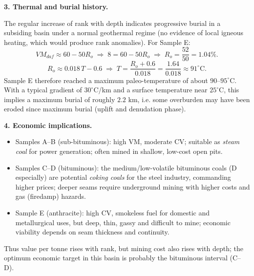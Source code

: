 \documentclass[11pt]{article}
\begin{document}
\begin{corrige}
\textbf{3. Thermal and burial history.}\par
The regular increase of rank with depth indicates progressive burial in a subsiding basin under a normal geothermal regime (no evidence of local igneous heating, which would produce rank anomalies). For Sample E:
\[
VM_{daf} \approx 60 - 50R_o \;\Rightarrow\; 8 = 60 - 50R_o \;\Rightarrow\; R_o = \frac{52}{50} = 1.04\%.
\]
\[
R_o \approx 0.018\,T - 0.6 \;\Rightarrow\; T = \frac{R_o + 0.6}{0.018} = \frac{1.64}{0.018} \approx 91^\circ\mathrm{C}.
\]
Sample E therefore reached a maximum paleo-temperature of about $90$--$95^\circ$C. With a typical gradient of $30^\circ$C/km and a surface temperature near $25^\circ$C, this implies a maximum burial of roughly $2.2$ km, i.e. some overburden may have been eroded since maximum burial (uplift and denudation phase).

\textbf{4. Economic implications.}\par
\begin{itemize}
\item Samples A--B (sub-bituminous): high VM, moderate CV; suitable as \emph{steam coal} for power generation; often mined in shallow, low-cost open pits.
\item Samples C--D (bituminous): the medium/low-volatile bituminous coals (D especially) are potential \emph{coking coals} for the steel industry, commanding higher prices; deeper seams require underground mining with higher costs and gas (firedamp) hazards.
\item Sample E (anthracite): high CV, smokeless fuel for domestic and metallurgical uses, but deep, thin, gassy and difficult to mine; economic viability depends on seam thickness and continuity.
\end{itemize}
Thus value per tonne rises with rank, but mining cost also rises with depth; the optimum economic target in this basin is probably the bituminous interval (C--D).
\end{corrige}
\end{document}
